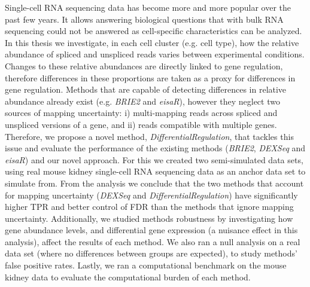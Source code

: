 \documentclass[11pt,a4paper,oneside]{book}
\begin{document}
Single-cell RNA sequencing data has become more and more popular over the past few years. It allows answering biological questions that with bulk RNA sequencing could not be answered as cell-specific characteristics can be analyzed. In this thesis we investigate, in each cell cluster (e.g. cell type), how the relative abundance of spliced and unspliced reads varies between experimental conditions. Changes to these relative abundances are directly linked to gene regulation, therefore differences in these proportions are taken as a proxy for differences in gene regulation. Methods that are capable of detecting differences in relative abundance already exist (e.g. \emph{BRIE2} and \emph{eisaR}), however they neglect two sources of mapping uncertainty: i) multi-mapping reads across spliced and unspliced versions of a gene, and ii) reads compatible with multiple genes. Therefore, we propose a novel method, \emph{DifferentialRegulation},  that tackles this issue and evaluate the performance of the existing methods (\emph{BRIE2}, \emph{DEXSeq} and \emph{eisaR}) and our novel approach. For this we created two semi-simulated data sets, using real mouse kidney single-cell RNA sequencing data as an anchor data set to simulate from. From the analysis we conclude that the two methods that account for mapping uncertainty (\emph{DEXSeq} and \emph{DifferentialRegulation}) have significantly higher TPR and better control of FDR than the methods that ignore mapping uncertainty. Additionally, we studied methods robustness by investigating how gene abundance levels, and differential gene expression (a nuisance effect in this analysis), affect the results of each method. We also ran a null analysis on a real data set (where no differences between groups are expected), to study methods' false positive rates. Lastly, we ran a computational benchmark on the mouse kidney data to evaluate the computational burden of each method.







\end{document}
